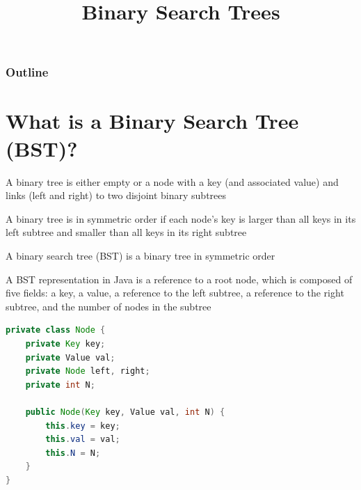 \documentclass[8pt,a4paper,compress]{beamer}
\title{Binary Search Trees}
\date{}
\begin{document}
\begin{frame}
\vfill
\titlepage
\end{frame}

\begin{frame}
\frametitle{Outline}
\tableofcontents
\end{frame}

\section{What is a Binary Search Tree (BST)?}
\begin{frame}[fragile]
\pause

A binary tree is either empty or a node with a key (and associated value) and links (left and right) to two disjoint binary subtrees

\pause
\bigskip

A binary tree is in symmetric order if each node's key is larger than all keys in its left subtree and smaller than all keys in its right subtree

\pause
\bigskip

A binary search tree (BST) is a binary tree in symmetric order

\smallskip

\begin{center}
\end{center}
\end{frame}

\begin{frame}[fragile]
\pause

A BST representation in Java is a reference to a root node, which is composed of five fields: a key, a value, a reference to the left subtree, a reference to the right subtree, and the number of nodes in the subtree

\pause

\begin{lstlisting}[language=Java]
private class Node {
    private Key key; 
    private Value val; 
    private Node left, right; 
    private int N;

    public Node(Key key, Value val, int N) {
        this.key = key;
        this.val = val;
        this.N = N;
    }
}
\end{lstlisting}
\end{frame}
\end{document}
